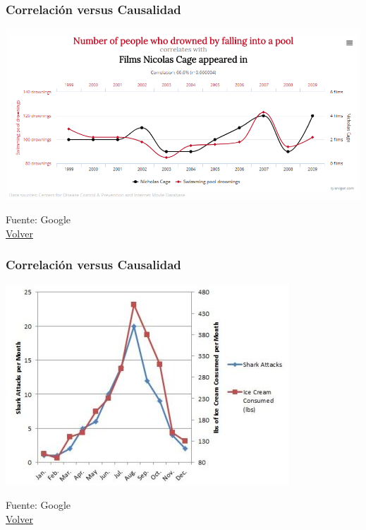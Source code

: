 \documentclass{beamer}
\begin{document}

\begin{frame} \label{hdos}
\frametitle{Correlación versus Causalidad}
\begin{center}
    \includegraphics[scale=0.3]{Figures/Introduccion_1.4.1_corrcaus.png}
\end{center}
Fuente: Google \\
\hyperlink{uno}{Volver} 
\end{frame}

\begin{frame} \label{htres}
\frametitle{Correlación versus Causalidad}
\begin{center}
    \includegraphics[scale=0.55]{Figures/Introduccion_1.5_ovbias.jpg}
\end{center}
Fuente: Google \\
\hyperlink{uno}{Volver} 
\end{frame}
\end{document}
